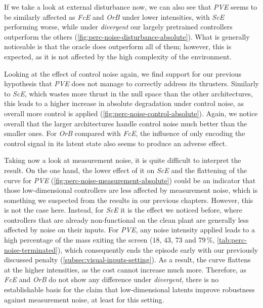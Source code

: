 If we take a look at external disturbance now, we can also see that \emph{PVE} seems to be similarly
affected as \emph{FcE} and \emph{OrB} under lower intensities, with \emph{ScE} performing worse, while under \emph{divergent}
our largely pretrained controllers outperform the others (\cref{fig:perc-noise-disturbance-absolute}). What is generally noticeable is that the
oracle does outperform all of them; however, this is expected, as it is not affected by the high complexity
of the environment.

Looking at the effect of control noise again, we find support for our previous hypothesis that
\emph{PVE} does not manage to correctly address its thrusters. Similarly to \emph{ScE}, which wastes
more thrust in the null space than the other architectures, this leads to a higher increase in absolute degradation
under control noise, as overall more control is applied (\cref{fig:perc-noise-control-absolute}). Again, we
notice overall that the larger architectures handle control noise much better than the smaller ones. For
\emph{OrB} compared with \emph{FcE}, the influence of only encoding the control signal in its latent state
also seems to produce an adverse effect.

Taking now a look at measurement noise, it is quite difficult to interpret the result. On the one hand,
the lower effect of it on \emph{ScE} and the flattening of the curve for \emph{PVE} (\cref{fig:perc-noise-measurement-absolute}) could be an indicator that
those low-dimensional controllers are less affected by measurement noise, which is something we suspected from the results in our previous chapters. However,
this is not the case here. Instead, for \emph{ScE} it is the effect we noticed before, where controllers
that are already non-functional on the clean plant are generally less affected by noise on their inputs. For \emph{PVE},
any noise intensity applied leads to a high percentage of the mass exiting the screen ($18$, $43$, $73$ and $79\,\%$, \cref{tab:perc-noise-terminated}),
which consequently ends the episode early with our previously discussed penalty (\cref{subsec:visual-inputs-setting}).
As a result, the curve flattens at the higher intensities, as the cost cannot increase much more.
Therefore, as \emph{FcE} and \emph{OrB} do not show any difference under \emph{divergent}, there is no establishable basis for the
claim that low-dimensional latents improve robustness against measurement noise, at least for this setting.

